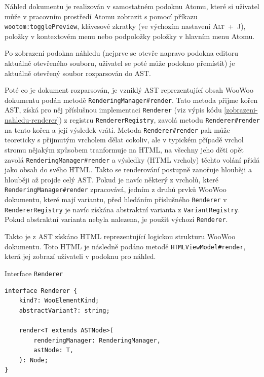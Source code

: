 \begin{sloppypar}
Náhled dokumentu je realizován v samostatném podoknu Atomu, které si uživatel může v pracovním prostředí Atomu zobrazit
s pomocí příkazu \texttt{wootom:togglePreview}, klávesové zkratky (ve výchozím nastavení \textsc{Alt~+~J}),
položky  v kontextovém menu nebo podpoložky  položky  v hlavním
menu Atomu.
\end{sloppypar}

Po zobrazení podokna náhledu (nejprve se otevře napravo podokna editoru aktuálně otevřeného souboru, uživatel se poté
může podokno přemístit) je aktuálně otevřený soubor rozparsován do AST.

\begin{sloppypar}
Poté co je dokument rozparsován, je vzniklý AST reprezentující obsah WooWoo dokumentu podán metodě
\texttt{RenderingManager#render}. Tato metoda přijme kořen AST, získá pro něj příslušnou implementaci
\texttt{Renderer} (viz výpis kódu \ref{zobrazeni-nahledu-renderer}) z registru
\texttt{RendererRegistry}, zavolá metodu \texttt{Renderer#render} na tento kořen a její výsledek
vrátí. Metoda \texttt{Renderer#render} pak může teoreticky s přijmutým vrcholem dělat cokoliv, ale v typickém
případě vrchol stromu nějakým způsobem tranformuje na HTML, na všechny jeho děti opět zavolá
\texttt{RenderingManager#render} a výsledky (HTML vrcholy) těchto volání přidá jako obsah do svého HTML. Takto
se renderování postupně zanořuje hlouběji a hlouběji až projde celý AST. Pokud je navíc některý z vrcholů, které
\texttt{RenderingManager#render} zpracovává, jedním z druhů prvků WooWoo dokumentu, které mají variantu,
před hledáním příslušného \texttt{Renderer} v \texttt{RendererRegistry} je navíc získána abstraktní
varianta z \texttt{VariantRegistry}. Pokud abstraktní varianta nebyla nalezena, je použit výchozí
\texttt{Renderer}.
\end{sloppypar}

\begin{sloppypar}
Takto je z AST získáno HTML reprezentující logickou strukturu WooWoo dokumentu. Toto HTML je následně podáno metodě
\texttt{HTMLViewModel#render}, která jej zobrazí uživateli v podoknu pro náhled.
\end{sloppypar}

\begin{listing}
    \caption{Interface \texttt{Renderer}}
    \label{zobrazeni-nahledu-renderer}
    \begin{verbatim}
interface Renderer {
    kind?: WooElementKind;
    abstractVariant?: string;

    render<T extends ASTNode>(
        renderingManager: RenderingManager,
        astNode: T,
    ): Node;
}
    \end{verbatim}
\end{listing}

